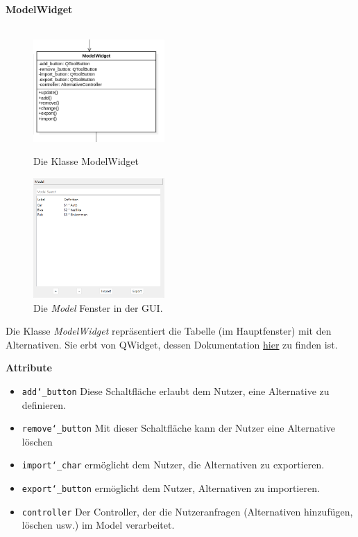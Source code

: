 \documentclass{article}
\begin{document}
\newpage
\textbf{\large{ModelWidget}}\\\\
\begin{figure}[H]%
    \centering
    \begin{minipage}[b]{0.4\textwidth}
        \includegraphics[width=5cm]{entwurf/Entwurf_dokument/img/Alissa/ModelWidget.png}
        \caption{Die Klasse ModelWidget}
    \end{minipage}
    \hfill
    \begin{minipage}[b]{0.4\textwidth}
        \includegraphics[width=5cm]{entwurf/Entwurf_dokument/img/Alissa/ModelGUI.png} 
    \caption{Die \textit{Model} Fenster in der GUI.}
    \end{minipage}
\end{figure}
Die Klasse \textit{ModelWidget} repräsentiert die Tabelle (im Hauptfenster) mit den Alternativen. Sie erbt von QWidget, dessen Dokumentation \href{https://doc.qt.io/qt-6/qwidget.html}{hier} zu finden ist. 
\newline \newline

\textbf{{Attribute}}
\begin{itemize}
\item \texttt{add\char`_button} \newline Diese Schaltfläche erlaubt dem Nutzer, eine Alternative zu definieren.
\item \texttt{remove\char`_button} \newline Mit dieser Schaltfläche kann der Nutzer eine Alternative löschen
\item \texttt{import\char`_char} \newline ermöglicht dem Nutzer, die Alternativen zu exportieren.
\item \texttt{export\char`_button} \newline ermöglicht dem Nutzer, Alternativen zu importieren.
\item \texttt{controller} \newline Der Controller, der die Nutzeranfragen (Alternativen hinzufügen, löschen usw.) im Model verarbeitet.
\end{itemize}
\end{document}
